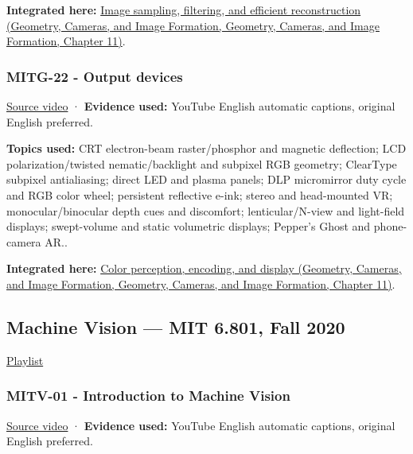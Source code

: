 \textbf{Integrated here:} \href{../03-Geometry-Cameras-and-Image-Formation/main.pdf\#nameddest=03-visual-computing-i-ch004-image-sampling-filtering-and-efficient-reconstruction}{Image sampling, filtering, and efficient reconstruction (Geometry, Cameras, and Image Formation, Geometry, Cameras, and Image Formation, Chapter 11)}.

\subsubsection{MITG-22 - Output devices}\label{04-visual-computing-ii-ch036-mitg-22---output-devices}

\href{https://www.youtube.com/watch?v=Z5693mG_iCE}{Source video} · \textbf{Evidence used:} YouTube English automatic captions, original English preferred.

\textbf{Topics used:} CRT electron-beam raster/phosphor and magnetic deflection; LCD polarization/twisted nematic/backlight and subpixel RGB geometry; ClearType subpixel antialiasing; direct LED and plasma panels; DLP micromirror duty cycle and RGB color wheel; persistent reflective e-ink; stereo and head-mounted VR; monocular/binocular depth cues and discomfort; lenticular/N-view and light-field displays; swept-volume and static volumetric displays; Pepper's Ghost and phone-camera AR..

\textbf{Integrated here:} \href{../03-Geometry-Cameras-and-Image-Formation/main.pdf\#nameddest=03-visual-computing-i-ch004-color-perception-encoding-and-display}{Color perception, encoding, and display (Geometry, Cameras, and Image Formation, Geometry, Cameras, and Image Formation, Chapter 11)}.

\subsection{Machine Vision --- MIT 6.801, Fall 2020}\label{04-visual-computing-ii-ch036-machine-vision-mit-6.801-fall-2020}

\href{https://www.youtube.com/playlist?list=PLUl4u3cNGP63pfpS1gV5P9tDxxL_e4W8O}{Playlist}

\subsubsection{MITV-01 - Introduction to Machine Vision}\label{04-visual-computing-ii-ch036-mitv-01---introduction-to-machine-vision}

\href{https://www.youtube.com/watch?v=tY2gczObpfU}{Source video} · \textbf{Evidence used:} YouTube English automatic captions, original English preferred.

